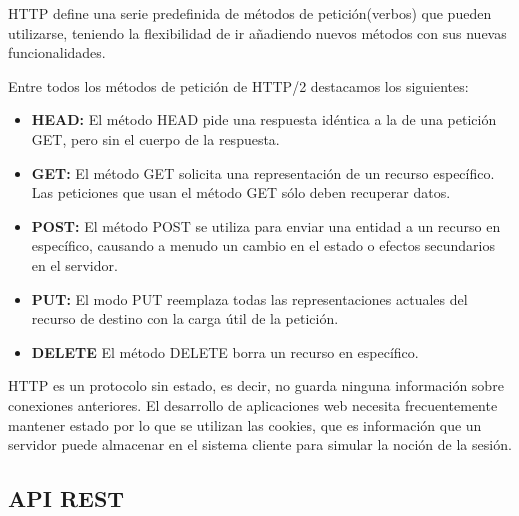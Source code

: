 HTTP define una serie predefinida de métodos de petición(verbos) que pueden utilizarse, teniendo la flexibilidad de ir añadiendo nuevos métodos con sus nuevas funcionalidades. 

Entre todos los métodos de petición de HTTP/2 destacamos los siguientes:
\begin{itemize}
    \item \textbf {HEAD:} El método HEAD pide una respuesta idéntica a la de una petición GET, pero sin el cuerpo de la respuesta.
    \item \textbf {GET:} El método GET  solicita una representación de un recurso específico. Las peticiones que usan el método GET sólo deben recuperar datos.
    \item \textbf {POST:} El método POST se utiliza para enviar una entidad a un recurso en específico, causando a menudo un cambio en el estado o efectos secundarios en el servidor.
    \item \textbf {PUT:} El modo PUT reemplaza todas las representaciones actuales del recurso de destino con la carga útil de la petición.
    \item \textbf {DELETE} El método DELETE borra un recurso en específico.
\end{itemize}

HTTP es un protocolo sin estado, es decir, no guarda ninguna información sobre conexiones anteriores. El desarrollo de aplicaciones web necesita frecuentemente mantener estado por lo que se utilizan las cookies, que es información que un servidor puede almacenar en el sistema cliente para simular la noción de la sesión.

\subsection*{API REST}

